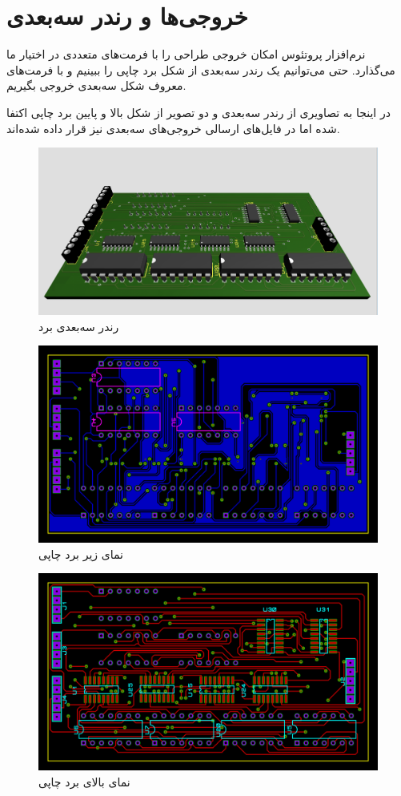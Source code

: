 \section{
خروجی‌ها و رندر سه‌بعدی
}
نرم‌افزار پروتئوس امکان خروجی طراحی را با فرمت‌های متعددی در اختیار ما می‌گذارد. حتی می‌توانیم یک رندر سه‌بعدی از شکل برد چاپی را
ببینیم و با فرمت‌های معروف شکل سه‌بعدی خروجی بگیریم.

در اینجا به تصاویری از رندر سه‌بعدی و دو تصویر از شکل بالا و پایین برد چاپی اکتفا شده اما در فایل‌های ارسالی خروجی‌های سه‌بعدی نیز قرار داده شده‌اند.

\begin{figure}[h!]
    \centering
    \includegraphics[width=\textwidth]{images/ALU-PCB-3D.png}
    \caption{
    رندر سه‌بعدی برد
    }
\end{figure}

\begin{figure}[h!]
    \centering
    \includegraphics[width=\textwidth]{images/ALU-PCB-BOT.png}
    \caption{
    نمای زیر برد چاپی
    }
\end{figure}

\begin{figure}[h!]
    \centering
    \includegraphics[width=\textwidth]{images/ALU-PCB-TOP.png}
    \caption{
    نمای بالای برد چاپی
    }
\end{figure}

